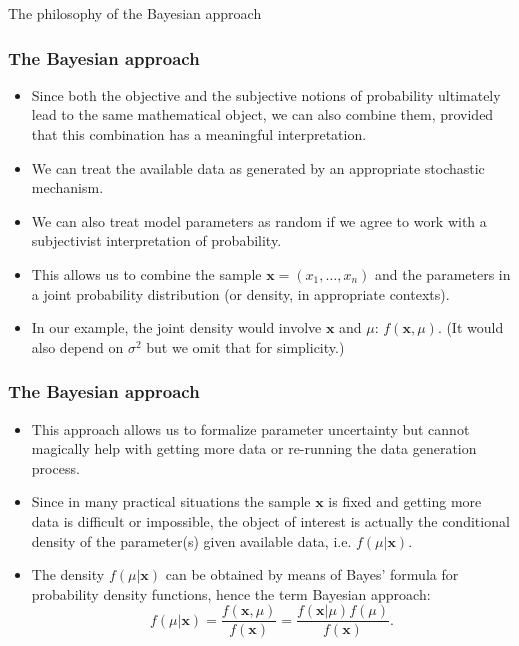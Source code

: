 \documentclass[10pt]{beamer}
\theoremstyle{definition}
\begin{document}
\begin{section}{The philosophy of the Bayesian approach}
\begin{frame}
\frametitle{The Bayesian approach}
\begin{itemize}\itemsep1em
\item Since both the objective and the subjective notions of probability ultimately lead to the same mathematical object, we can also combine them, provided that this combination has a meaningful interpretation. \pause
\item We can treat the available data as generated by an appropriate stochastic mechanism.
\item We can also treat model parameters as random if we agree to work with a subjectivist interpretation of probability.
\item This allows us to combine the sample $\mathbf{x}=(x_1,\ldots,x_n)$ and the parameters in a joint probability distribution (or density, in appropriate contexts).
\item In our example, the joint density would involve $\mathbf{x}$ and
$\mu$: $f(\mathbf{x},\mu)$. (It would also depend on $ \sigma^2 $ but we omit that for simplicity.)
\end{itemize}
\end{frame}

\begin{frame}
\frametitle{The Bayesian approach}
\begin{itemize}\itemsep1em
\item This approach allows us to formalize parameter uncertainty but cannot magically help with getting more data or re-running the data generation process.
\item Since in many practical situations the sample $\mathbf{x}$ is fixed and getting more data is difficult or impossible, the object of interest is actually the conditional density of the parameter(s) given available data, i.e. $f(\mu|\mathbf{x})$.
\item The density $f(\mu|\mathbf{x})$ can be obtained by means of Bayes' formula for probability density functions, hence the term Bayesian approach:
\begin{equation}
\label{eq:Bayesformula}
f(\mu|\mathbf{x})=\frac{f(\mathbf{x},\mu)}{f(\mathbf{x})}=\frac{f(\mathbf{x}|\mu)f(\mu)}{f(\mathbf{x})}.
\end{equation}
\end{itemize}
\end{frame}


\end{section}
\end{document}
